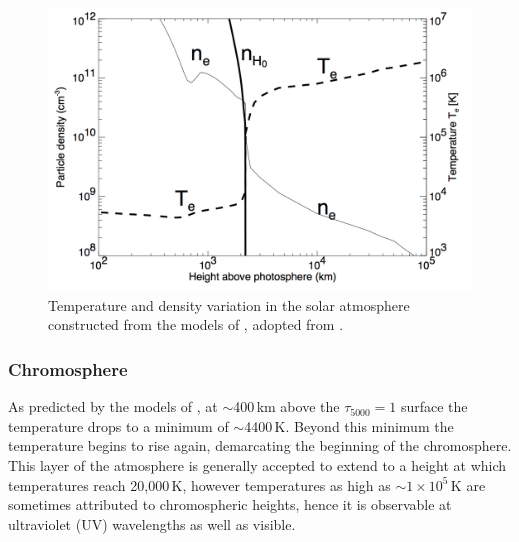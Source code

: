 
\begin{figure}[!t]
\begin{center}
\includegraphics[scale=0.3]{images/FAL-C.png}
\caption[The temperature and density as a function of height above the photosphere]{Temperature and density variation in the solar atmosphere constructed from the models of \citep{vernazza1981, fontenla1988, gabriel1976}, adopted from \citep{phillips2008}.}
\label{fig:val} 
\end{center}
\end{figure}


\subsubsection{Chromosphere}\label{sec:122}

As predicted by the models of \citep{vernazza1981, fontenla1988, gabriel1976}, at $\sim$400\,km above the $\tau_{5000}=1$ surface the temperature drops to a minimum of $\sim$4400\,K. Beyond this minimum the temperature begins to rise again, demarcating the beginning of the chromosphere. This layer of the atmosphere is generally accepted to extend to a height at which temperatures reach 20,000\,K, however temperatures as high as $\sim$$1\times10^5$\,K are sometimes attributed to chromospheric heights, hence it is observable at ultraviolet (UV) wavelengths as well as visible. 

